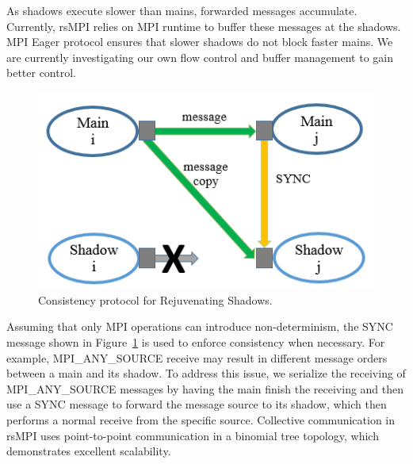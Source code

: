 As shadows execute slower than mains, forwarded messages accumulate. Currently, rsMPI relies on MPI runtime to buffer these messages at the shadows. MPI Eager protocol ensures that slower shadows do not block faster mains. We are currently investigating our own flow control and buffer management to gain better control.

\begin{figure}[!t]
  \begin{center}
      	\includegraphics[width=0.8\columnwidth]{Figures/cons_protocol_hpcc.png}
  \end{center}
  \caption{Consistency protocol for Rejuvenating Shadows.}
  \label{fig:cons_protocol}
  \vskip -0.2in
\end{figure}

Assuming that only MPI operations can introduce non-determinism, the SYNC message shown in Figure~\ref{fig:cons_protocol} is used to enforce consistency when necessary. For example, MPI\_ANY\_SOURCE receive may result in different message orders between a main and its shadow. To address this issue, we serialize the receiving of MPI\_ANY\_SOURCE messages by having the main finish the receiving and then use a SYNC message to forward the message source to its shadow, which then performs a normal receive from the specific source. 
Collective communication in rsMPI uses point-to-point communication in a binomial tree topology, which demonstrates excellent scalability.

